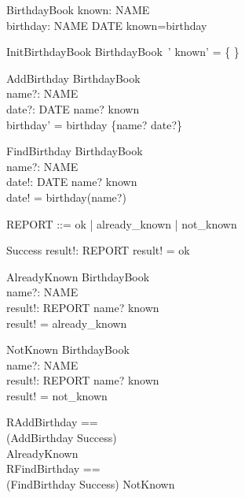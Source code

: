 \documentclass{article}
\begin{document}
\begin{zed}
\end{zed}


\begin{schema}{BirthdayBook}
known: \power NAME \\ 
birthday: NAME \pfun DATE 
\where 
	known=\dom birthday
\end{schema}


\begin{schema}{InitBirthdayBook} 
BirthdayBook~' 
\where 
	known' = \{ \}
\end{schema}


\begin{schema}{AddBirthday}
    \Delta BirthdayBook \\
    name?: NAME \\
    date?: DATE
\where
    name? \notin known\\
    birthday' = birthday \cup \{name? \mapsto date?\}
\end{schema}



\begin{schema}{FindBirthday}
    \Xi BirthdayBook \\
    name?: NAME \\
    date!: DATE 
\where
    	name? \in known\\
    	date! = birthday(name?)
\end{schema}


\begin{zed} 
    REPORT ::= ok | already\_known | not\_known
\end{zed}



\begin{schema}{Success}
    result!: REPORT
\where
    result! = ok
\end{schema}


\begin{schema}{AlreadyKnown}
    \Xi BirthdayBook \\
    name?: NAME \\
    result!: REPORT
\where
	name? \in known \\
	result! = already\_known
\end{schema}

\begin{schema}{NotKnown}
    \Xi BirthdayBook \\
    name?: NAME \\
    result!: REPORT
\where
	name? \notin known \\
	result! = not\_known
\end{schema}


\begin{zed} 
    RAddBirthday ==\\ (AddBirthday \land Success)\\  \lor AlreadyKnown \\
    RFindBirthday ==\\ (FindBirthday \land Success) \lor NotKnown \\
\end{zed}
\end{document}
